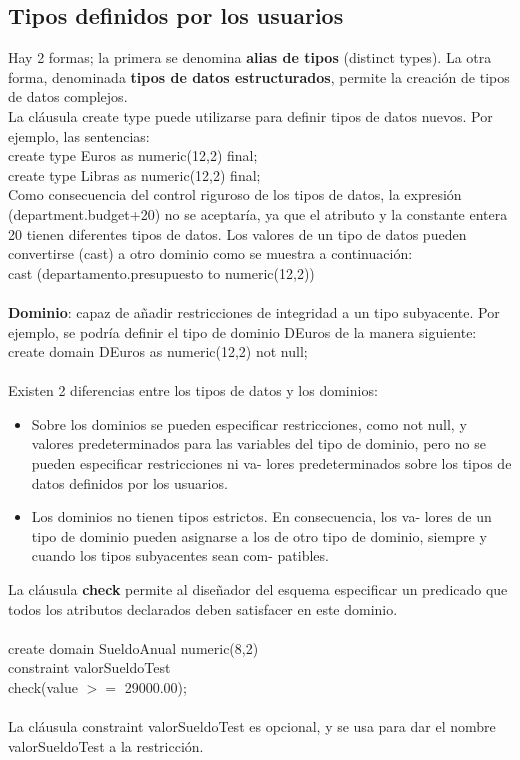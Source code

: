 \documentclass{article}
\begin{document}
\subsection{Tipos definidos por los usuarios}
Hay 2 formas; la primera se denomina \textbf{alias de tipos} (distinct types). La otra forma, denominada \textbf{tipos de datos estructurados}, permite la creación de tipos de datos
complejos. \\
La cláusula create type puede utilizarse para definir tipos de
datos nuevos. Por ejemplo, las sentencias: \\
create type Euros as numeric(12,2) final; \\
create type Libras as numeric(12,2) final; \\
Como consecuencia del control riguroso de los tipos de datos, la
expresión (department.budget+20) no se aceptaría, ya que el atributo y la constante entera 20 tienen diferentes tipos de datos. Los valores de un tipo de datos pueden convertirse (cast) a otro dominio como se muestra a continuación: \\
cast (departamento.presupuesto to numeric(12,2)) \\
\\
\textbf{Dominio}: capaz de añadir restricciones de integridad a un tipo subyacente. Por ejemplo, se podría definir el tipo de dominio DEuros de la manera siguiente: \\
create domain DEuros as numeric(12,2) not null; \\ 
\\
Existen 2 diferencias entre los tipos de datos y los dominios: 
\begin{itemize}
\item Sobre los dominios se pueden especificar restricciones, como
not null, y valores predeterminados para las variables del tipo
de dominio, pero no se pueden especificar restricciones ni va-
lores predeterminados sobre los tipos de datos definidos por
los usuarios.

\item Los dominios no tienen tipos estrictos. En consecuencia, los va-
lores de un tipo de dominio pueden asignarse a los de otro tipo
de dominio, siempre y cuando los tipos subyacentes sean com-
patibles.

\end{itemize}

La cláusula \textbf{check} permite al diseñador del esquema especificar un predicado que todos los atributos declarados deben satisfacer en este dominio. \\
\\
create domain SueldoAnual numeric(8,2) \\
constraint valorSueldoTest \\
check(value $>=$ 29000.00); \\
\\
La cláusula constraint valorSueldoTest es opcional, y se usa para dar el nombre valorSueldoTest a la restricción.
\end{document}
